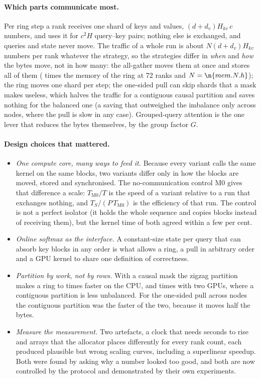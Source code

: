 \paragraph{Which parts communicate most.} Per ring step a rank receives one shard
of keys and values, $(d+d_v)H_{kv}\,c$ numbers, and uses it for $c^2H$ query--key
pairs; nothing else is exchanged, and queries and state never move. The traffic of
a whole run is about $N(d+d_v)H_{kv}$ numbers per rank whatever the strategy, so the
strategies differ in \emph{when} and \emph{how} the bytes move, not in how many:
the all-gather moves them at once and stores all of them ( times the
memory of the ring at 72 ranks and $N=\n{mem.N.h}$); the ring moves one shard per step; the one-sided
pull can skip shards that a mask makes useless, which halves the traffic for a
contiguous causal partition and saves nothing for the balanced one (a saving that
outweighed the imbalance only across nodes, where the pull is slow in any case). Grouped-query
attention is the one lever that reduces the bytes themselves, by the group factor
$G$.

\paragraph{Design choices that mattered.}
\begin{itemize}
\item \emph{One compute core, many ways to feed it.} Because every variant calls
the same kernel on the same blocks, two variants differ only in how the blocks are
moved, stored and synchronised. The no-communication control M0 gives that
difference a scale: $T_\text{M0}/T$ is the speed of a variant relative to a run that
exchanges nothing, and $T_S/(P\,T_\text{M0})$ is the efficiency of that run. The
control is not a perfect isolator (it holds the whole sequence and copies blocks
instead of receiving them), but the kernel time of both agreed within a few per
cent.
\item \emph{Online softmax as the interface.} A constant-size state per query that
can absorb key blocks in any order is what allows a ring, a pull in arbitrary
order and a GPU kernel to share one definition of correctness.
\item \emph{Partition by work, not by rows.} With a causal mask the zigzag
partition makes a ring  to
 times faster on the CPU, and
 times with two GPUs, where a contiguous partition is less
unbalanced. For the
one-sided pull across nodes the contiguous partition was the faster of the two,
because it moves half the bytes.
\item \emph{Measure the measurement.} Two artefacts, a clock that needs seconds to
rise and arrays that the allocator places differently for every rank count, each
produced plausible but wrong scaling curves, including a superlinear speedup. Both
were found by asking why a number looked too good, and both are now controlled by
the protocol and demonstrated by their own experiments.
\end{itemize}

